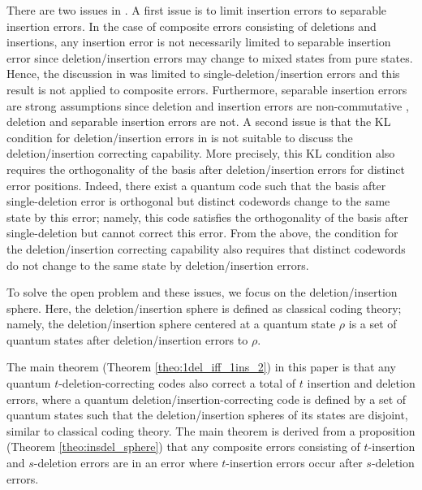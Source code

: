 \documentclass[reprint,amsmath,amssymb,aps,]{revtex4-2}
\theoremstyle{definition}
\newcommand{\1}{\mbox{1}\hspace{-0.25em}\mbox{l}}%
\begin{document}
There
are
two issues
in \cite{shibayama2022equivalence,shibayama2025necessary}.
A first issue
is
to limit insertion errors to separable insertion errors.
In the case of
composite errors consisting of deletions and insertions,
any insertion error is not necessarily limited to
separable insertion error
since deletion/insertion errors
may change to mixed states from pure states.
Hence,
the discussion in \cite{shibayama2025necessary}
was limited to single-deletion/insertion errors
and
this result is not applied to composite errors.
Furthermore,
separable insertion errors
are
strong assumptions
since
deletion and insertion errors are non-commutative \cite{hagiwara2024introduction},
deletion and separable insertion errors are not.
A second issue is that
the KL condition for deletion/insertion errors in \cite{shibayama2022equivalence,shibayama2025necessary}
is not 
suitable
to discuss
the deletion/insertion correcting capability.
More precisely,
this KL condition
also requires 
the orthogonality of the basis after deletion/insertion errors
for distinct error positions.
Indeed,
there exist
a quantum code \cite{hagiwara2024pure}
such that
the basis after single-deletion error
is
orthogonal
but
distinct codewords
change
to
the same state
by this error;
namely,
this code
satisfies 
the orthogonality of the basis after single-deletion
but
cannot correct this error.
From the above,
the condition for the deletion/insertion correcting capability
also requires that 
distinct codewords
do not change
to
the same state
by deletion/insertion errors.

To solve the open problem and these issues,
we focus on the deletion/insertion sphere.
Here,
the deletion/insertion sphere
is defined as classical coding theory;
namely,
the deletion/insertion sphere centered at a quantum state $\rho$
is
a set of quantum states
after
deletion/insertion errors to $\rho$.

The main theorem (Theorem \ref{theo:1del_iff_1ins_2}) in this paper
is that
any quantum $t$-deletion-correcting codes
also correct a total of $t$ insertion and deletion errors,
where
a quantum deletion/insertion-correcting code
is defined
by
a set of quantum states
such that 
the deletion/insertion spheres of its states are disjoint,
similar to classical coding theory.
The main theorem is derived
from a proposition (Theorem \ref{theo:insdel_sphere}) that
any composite errors consisting of $t$-insertion and $s$-deletion errors
are in
an error where $t$-insertion errors occur after $s$-deletion errors.
\end{document}
